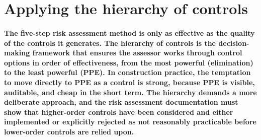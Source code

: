 \section{Applying the hierarchy of controls}

\paragraph{The five-step risk assessment method is only as effective as the quality of the controls it generates. The hierarchy of controls is the decision-making framework that ensures the assessor works through control options in order of effectiveness, from the most powerful (elimination) to the least powerful (PPE). In construction practice, the temptation to move directly to PPE as a control is strong, because PPE is visible, auditable, and cheap in the short term. The hierarchy demands a more deliberate approach, and the risk assessment documentation must show that higher-order controls have been considered and either implemented or explicitly rejected as not reasonably practicable before lower-order controls are relied upon.}

